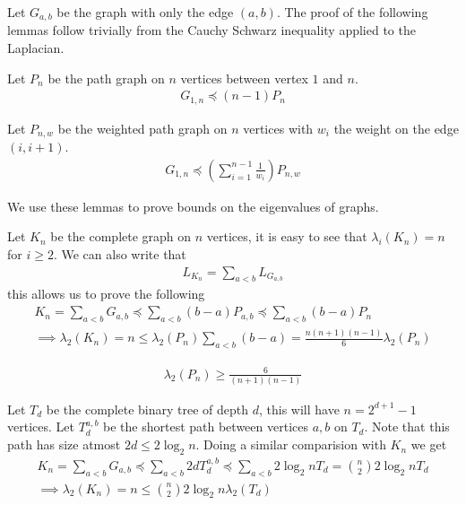 \documentclass{math}
\begin{document}
Let $G_{a, b}$ be the graph with only the edge $(a, b)$.
The proof of the following lemmas follow trivially from the Cauchy Schwarz inequality applied to the Laplacian.

\begin{lemma}
    Let $P_n$ be the path graph on $n$ vertices between vertex $1$ and $n$.
    \begin{align*}
        G_{1, n} \preceq (n - 1)P_n 
    \end{align*}
\end{lemma}

\begin{lemma}
    Let $P_{n, w}$ be the weighted path graph on $n$ vertices with $w_i$ the weight on the edge $(i, i+1)$.
    \begin{align*}
        G_{1, n} \preceq \left(\sum_{i=1}^{n-1} \frac{1}{w_i}\right) P_{n, w}
    \end{align*}
\end{lemma}

We use these lemmas to prove bounds on the eigenvalues of graphs.

Let $K_n$ be the complete graph on $n$ vertices, it is easy to see that $\lambda_i(K_n) = n$ for $i \geq 2$.
We can also write that
\begin{align*}
    L_{K_n} = \sum_{a < b} L_{G_{a, b}}
\end{align*}
this allows us to prove the following
\begin{gather*}
    K_n = \sum_{a < b} G_{a, b} \preceq \sum_{a < b} (b - a) P_{a, b} \preceq \sum_{a < b} (b - a) P_n \\
    \implies \lambda_2(K_n) = n \leq \lambda_2(P_n) \sum_{a < b} (b - a) = \frac{n (n + 1) (n - 1)}{6} \lambda_2(P_n)
\end{gather*}

\begin{lemma}
    \begin{align*}
        \lambda_2(P_n) \geq \frac{6}{(n+1)(n-1)}
    \end{align*}
\end{lemma}

Let $T_d$ be the complete binary tree of depth $d$, this will have $n = 2^{d+1} - 1$ vertices.
Let $T_d^{a, b}$ be the shortest path between vertices $a, b$ on $T_d$.
Note that this path has size atmost $2d \leq 2 \log_{2} n$. Doing a similar comparision with $K_n$ we get
\begin{gather*}
    K_n = \sum_{a < b} G_{a, b} \preceq \sum_{a < b} 2d T_d^{a, b} \preceq \sum_{a < b} 2 \log_2 n T_d = \binom{n}{2} 2 \log_2 n T_d \\
    \implies \lambda_2(K_n) = n \leq \binom{n}{2} 2 \log_2 n \lambda_2(T_d)
\end{gather*}
\end{document}
